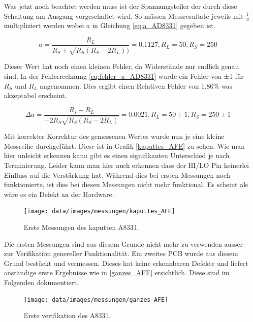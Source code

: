 Was jetzt noch beachtet werden muss ist der Spannungsteiler der durch diese Schaltung am Ausgang vorgeschaltet wird.
So müssen Messresultate jeweils mit $\frac{1}{a}$ multipliziert werden wobei $a$ in Gleichung \ref{eq:a_AD8331} gegeben ist.

\begin{equation}
    a = \frac{R_L}{R_S + \sqrt{R_S(R_S - 2R_L)})} = 0.1127, R_L =50, R_S = 250
    \label{eq:a_AD8331}
\end{equation}

Dieser Wert hat noch einen kleinen Fehler, da Widerstände nur endlich genau sind. In der Fehlerrechnung \ref{eq:fehler_a_AD8331} wurde ein Fehler von ±1 für $R_S$ und $R_L$ angenommen. Dies ergibt einen Relativen Fehler von 1.86\% was akzeptabel erscheint.

\begin{equation}
    \Delta a = \frac{R_s - R_L}{-2R_S\sqrt{R_S(R_S - 2R_L)}} = 0.0021, R_L = 50±1, R_S = 250±1
    \label{eq:a_AD8331}
\end{equation}

Mit korrekter Korrektur des gemessenen Wertes wurde nun je eine kleine Messreihe durchgeführt. Diese ist in Grafik \ref{kaputtes_AFE} zu sehen. Wie man hier unleicht erkennen kann gibt es einen signifikanten Unterschied je nach Terminierung.
Leider kann man hier auch erkennen dass der HI/LO Pin keinerlei Einfluss auf die Verstärkung hat. Während dies bei ersten Messungen noch funktionierte, ist dies bei diesen Messungen nicht mehr funktional. Es scheint als wäre es ein Defekt an der Hardware.

\begin{figure}[H]
\begin{center}
    \texttt{[image: data/images/messungen/kaputtes\_AFE]}
    \caption{Erste Messungen des kaputten A8331.}
    \label{fig:kaputtes_AFE}
\end{center}
\end{figure}

Die ersten Messungen sind aus diesem Grunde nicht mehr zu verwenden ausser zur Verifikation genereller Funktionalität. Ein zweites PCB wurde aus diesem Grund bestückt und vermessen. Dieses hat keine erkennbaren Defekte und liefert anständige erste Ergebnisse wie in \ref{ganzes_AFE} ersichtlich. Diese sind im Folgenden dokumentiert.

\begin{figure}[H]
\begin{center}
    \texttt{[image: data/images/messungen/ganzes\_AFE]}
    \caption{Erste verifikation des A8331.}
    \label{fig:ganzes_AFE}
\end{center}
\end{figure}

